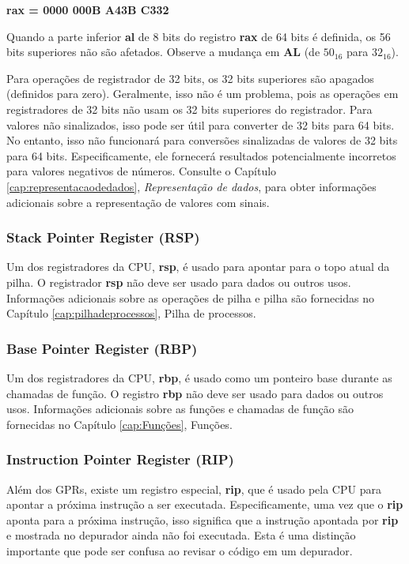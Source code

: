 \begin{center}
	\textbf{rax = 0000 000B A43B C332}
\end{center}

Quando a parte inferior \textbf{al} de 8 bits do registro \textbf{rax} de 64 bits é definida, os 56 bits superiores não são afetados. Observe a mudança em \textbf{AL} (de $ 50_{16} $ para $ 32_{16}$).

Para operações de registrador de 32 bits, os 32 bits superiores são apagados (definidos para zero). Geralmente, isso não é um problema, pois as operações em registradores de 32 bits não usam os 32 bits superiores do registrador. Para valores não sinalizados, isso pode ser útil para converter de 32 bits para 64 bits.
No entanto, isso não funcionará para conversões sinalizadas de valores de 32 bits para 64 bits.
Especificamente, ele fornecerá resultados potencialmente incorretos para valores negativos de números.
Consulte o Capítulo \ref{cap:representacaodedados}, \textit{Representação de dados}, para obter informações adicionais sobre a representação de valores com sinais.

\subsubsection{Stack Pointer Register (RSP)}
Um dos registradores da CPU, \textbf{rsp}, é usado para apontar para o topo atual da pilha. O registrador \textbf{rsp} não deve ser usado para dados ou outros usos. Informações adicionais sobre as operações de pilha e pilha são fornecidas no Capítulo \ref{cap:pilhadeprocessos}, Pilha de processos.

\subsubsection{Base Pointer Register (RBP)}
Um dos registradores da CPU, \textbf{rbp}, é usado como um ponteiro base durante as chamadas de função. O registro \textbf{rbp} não deve ser usado para dados ou outros usos. Informações adicionais sobre as funções e chamadas de função são fornecidas no Capítulo \ref{cap:Funções}, Funções.


\subsubsection{Instruction Pointer Register (RIP)}
Além dos GPRs, existe um registro especial, \textbf{rip}, que é usado pela CPU para apontar a próxima instrução a ser executada. Especificamente, uma vez que o \textbf{rip} aponta para a próxima instrução, isso significa que a instrução apontada por \textbf{rip} e mostrada no depurador ainda não foi executada. Esta é uma distinção importante que pode ser confusa ao revisar o código em um depurador.

